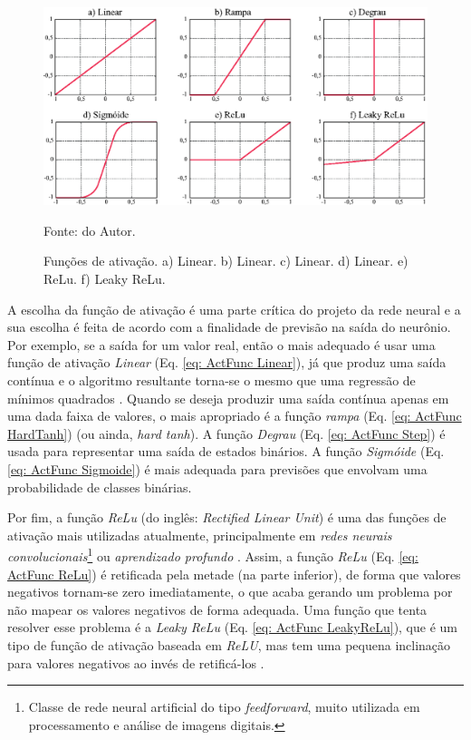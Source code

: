 \begin{figure}[H]
    \centering
    \includegraphics{04-Figuras/NetworkActvationFunction.eps}
    \caption{Funções de ativação. a) Linear. b) Linear. c) Linear. d) Linear. e) ReLu. f) Leaky ReLu.} \par
    Fonte: do Autor.
    \label{fig: NetworkActvationFunction}
\end{figure}

A escolha da função de ativação é uma parte crítica do projeto da rede neural e a sua escolha é feita de acordo com a finalidade de previsão na saída do neurônio. Por exemplo, se a saída for um valor real, então o mais adequado é usar uma função de ativação \textit{Linear} (Eq. \ref{eq: ActFunc Linear}), já que produz uma saída contínua e o algoritmo resultante torna-se o mesmo que uma regressão de mínimos quadrados \cite{aggarwal2018neural}. Quando se deseja produzir uma saída contínua apenas em uma dada faixa de valores, o mais apropriado é a função \textit{rampa} (Eq. \ref{eq: ActFunc HardTanh}) (ou ainda, \textit{hard tanh}). A função \textit{Degrau} (Eq. \ref{eq: ActFunc Step}) é usada para representar uma saída de estados binários. A função \textit{Sigmóide} (Eq. \ref{eq: ActFunc Sigmoide}) é mais adequada para previsões que envolvam uma probabilidade de classes binárias.

Por fim, a função \textit{ReLu} (do inglês: \textit{Rectified Linear Unit}) é uma das funções de ativação mais utilizadas atualmente, principalmente em \textit{redes neurais convolucionais}\footnote{Classe de rede neural artificial do tipo \textit{feedforward}, muito utilizada em processamento e análise de imagens digitais.} ou \textit{aprendizado profundo} \cite{agarap2018deep,lin2018research}. Assim, a função \textit{ReLu} (Eq. \ref{eq: ActFunc ReLu}) é retificada pela metade (na parte inferior), de forma que valores negativos tornam-se zero imediatamente, o que acaba gerando um problema por não mapear os valores negativos de forma adequada. Uma função que tenta resolver esse problema é a \textit{Leaky ReLu} (Eq. \ref{eq: ActFunc LeakyReLu}), que é um tipo de função de ativação baseada em \textit{ReLU}, mas tem uma pequena inclinação para valores negativos ao invés de retificá-los \cite{aggarwal2018neural}.

